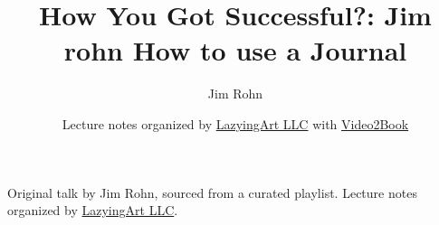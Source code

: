 \documentclass[11pt,oneside]{book}
\begin{document}
\frontmatter
\title{How You Got Successful?: Jim rohn How to use a Journal}
\author{Jim Rohn}
\date{Lecture notes organized by \href{https://lazying.art}{LazyingArt LLC} with \href{https://github.com/lachlanchen/Video2Book}{Video2Book}}
\maketitle
\begin{center}
\small Original talk by Jim Rohn, sourced from a curated playlist. Lecture notes organized by \href{https://lazying.art}{LazyingArt LLC}.
\end{center}
\clearpage
\mainmatter

\end{document}
